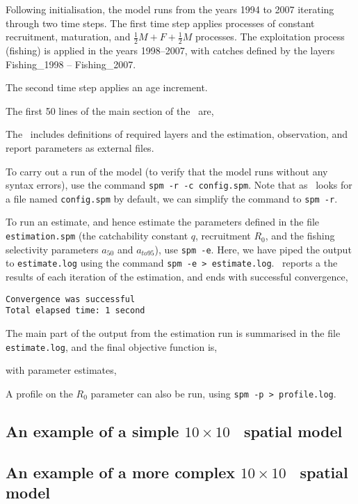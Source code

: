 Following initialisation, the model runs from the years 1994 to 2007 iterating through two time steps. The first time step applies processes of constant recruitment, maturation, and  $\frac{1}{2} M + F + \frac{1}{2} M$ processes. The exploitation process (fishing) is applied in the years 1998--2007, with catches defined by the layers Fishing\_1998 -- Fishing\_2007. 

The second time step applies an age increment.

The first 50 lines of the main section of the \config\ are,
 

The \config\ includes definitions of required layers and the estimation, observation, and report parameters as external files.

To carry out a run of the model (to verify that the model runs without any syntax errors), use the command \texttt{spm -r -c config.spm}. Note that as \SPM\ looks for a file named \texttt{config.spm} by default, we can simplify the command to \texttt{spm -r}. 

To run an estimate, and hence estimate the parameters defined in the file \texttt{estimation.spm} (the catchability constant $q$, recruitment $R_0$, and the fishing selectivity parameters $a_{50}$ and $a_{to95}$), use  \texttt{spm -e}. Here, we have piped the output to \texttt{estimate.log} using the command \texttt{spm -e > estimate.log}.  \SPM\ reports a the results of each iteration of the estimation, and ends with successful convergence,
\begin{verbatim}
Convergence was successful
Total elapsed time: 1 second
\end{verbatim}

The main part of the output from the estimation run is summarised in the file \texttt{estimate.log}, and the final objective function is,
 
with parameter estimates,
 

A profile on the $R_0$ parameter can also be run, using \texttt{spm -p > profile.log}.

\subsection{An example of a simple
  \texorpdfstring{$ 10 \times 10 $}{%
    10 x 10 
  }%
\ spatial model\label{example2}} 

 

\subsection{An example of a more complex
  \texorpdfstring{$ 10 \times 10 $}{%
    10 x 10 
  }%
\ spatial model\label{example3}} 

 
